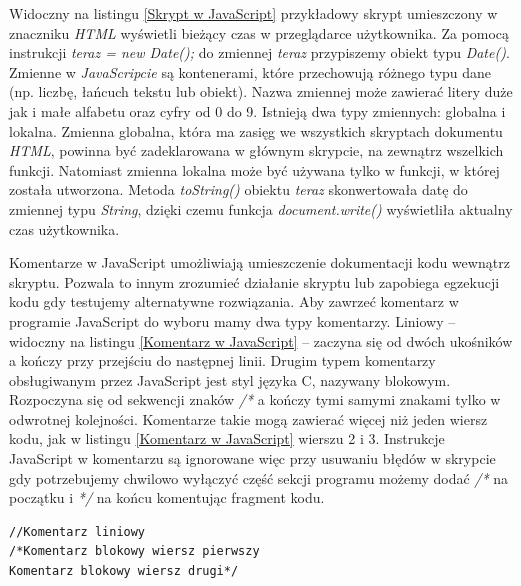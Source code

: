 \documentclass{iiuwb}
\begin{document}
Widoczny na listingu \ref{Skrypt w JavaScript} przykładowy skrypt umieszczony w znaczniku \textit{HTML} wyświetli bieżący czas w przeglądarce użytkownika. Za pomocą instrukcji \textit{teraz = new Date();} do zmiennej \textit{teraz} przypiszemy obiekt typu \textit{Date()}. Zmienne w \textit{JavaScripcie} są kontenerami, które przechowują różnego typu dane (np. liczbę, łańcuch tekstu lub obiekt). Nazwa zmiennej może zawierać litery duże jak i małe alfabetu oraz cyfry od 0 do 9. Istnieją dwa typy zmiennych: globalna i lokalna. Zmienna globalna, która ma zasięg we wszystkich skryptach dokumentu \textit{HTML}, powinna być zadeklarowana w głównym skrypcie, na zewnątrz wszelkich funkcji. Natomiast zmienna lokalna może być używana tylko w funkcji, w której została utworzona. Metoda \textit{toString()} obiektu \textit{teraz} skonwertowała datę do zmiennej typu \textit{String}, dzięki czemu funkcja \textit{document.write()} wyświetliła aktualny czas użytkownika.

Komentarze w JavaScript umożliwiają umieszczenie dokumentacji kodu  wew\-nątrz skryptu. Pozwala to innym zrozumieć działanie skryptu lub zapobiega egzekucji kodu gdy testujemy alternatywne rozwiązania. Aby zawrzeć komentarz w programie JavaScript do wyboru mamy dwa typy komentarzy. Liniowy -- widoczny na listingu \ref{Komentarz w JavaScript} -- zaczyna się od dwóch ukośników a kończy przy przejściu do następnej linii. Drugim typem komentarzy obsługiwanym przez JavaScript jest  styl języka C, nazywany blokowym. Rozpoczyna się od sekwencji znaków \textit{/*} a kończy tymi samymi znakami tylko w odwrotnej kolejności. Komentarze takie mogą zawierać więcej niż jeden wiersz kodu, jak w listingu \ref{Komentarz w JavaScript} wierszu 2 i 3. Instrukcje JavaScript w komentarzu są ignorowane więc przy usuwaniu błędów w skrypcie gdy potrzebujemy chwilowo wyłączyć część sekcji programu możemy dodać \textit{/*} na początku i \textit{*/} na końcu komentując fragment kodu.
\begin{lstlisting}[label=Komentarz w JavaScript, caption=Komentarz liniowy i blokowy]
//Komentarz liniowy
/*Komentarz blokowy wiersz pierwszy
Komentarz blokowy wiersz drugi*/
\end{lstlisting}
\end{document}

